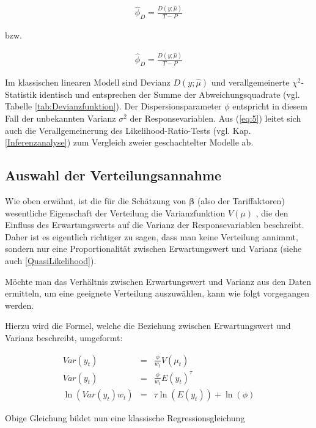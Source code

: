 \begin{eqnarray}\label{eq:7a}
\hat{\phi}_D=\frac{D(y;\hat{\mu})}{T-P}           
\end{eqnarray}

bzw.

\begin{eqnarray}\label{eq:7b}
\hat{\phi}_D=\frac{D(y;\hat{\mu})}{T-P}          
\end{eqnarray}

Im klassischen linearen Modell sind Devianz $D(y;\hat{\mu})$   und verallgemeinerte $\chi^2$-Statistik identisch und entsprechen der Summe der Abweichungsquadrate (vgl. Tabelle \ref{tab:Devianzfunktion}). Der Dispersionsparameter $\phi$ entspricht in diesem Fall der unbekannten Varianz $\sigma^2$  der Responsevariablen. Aus (\ref{eq:5}) leitet sich auch die Verallgemeinerung des Likelihood-Ratio-Tests (vgl. Kap. \ref{Inferenzanalyse}) zum Vergleich zweier geschachtelter Modelle ab.



\subsection{Auswahl der Verteilungsannahme} 

Wie oben erwähnt, ist die für die Schätzung von  $\bm{\beta}$  (also der Tariffaktoren) wesentliche Eigenschaft der Verteilung die Varianzfunktion $V(\mu)$ , die den Einfluss des Erwartungswerts auf die Varianz der Responsevariablen beschreibt. Daher ist es eigentlich richtiger zu sagen, dass man keine Verteilung annimmt, sondern nur eine Proportionalität zwischen Erwartungswert und Varianz (siehe auch \ref{QuasiLikelihood}).

Möchte man das Verhältnis zwischen Erwartungswert und Varianz aus den Daten ermitteln, um eine geeignete Verteilung auszuwählen, kann wie folgt vorgegangen werden.

Hierzu wird die Formel, welche die Beziehung zwischen Erwartungswert und Varianz beschreibt, umgeformt:

\begin{eqnarray}
Var(y_t) &=& \frac{\phi}{w_t}V(\mu_t)\\
Var(y_t) &=& \frac{\phi}{w_t}E(y_t)^\tau\\
\ln(Var(y_t)w_t) &=& \tau \ln(E(y_t)) + \ln(\phi)
\end{eqnarray}

Obige Gleichung bildet nun eine klassische Regressionsgleichung 

